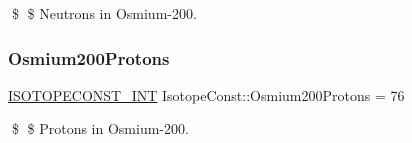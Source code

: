 \$ \$ Neutrons in Osmium-\/200. \mbox{\label{group___isotope_const-_osmium-_os200_ga6ffdf7ce7bc0f0890f05f348e34edfba}} 
\subsubsection{\texorpdfstring{Osmium200\+Protons}{Osmium200Protons}}
{\footnotesize\ttfamily \mbox{\hyperlink{group___isotope_const-_macros_ga5f18360b3e99483a35c32d789e62621c}{I\+S\+O\+T\+O\+P\+E\+C\+O\+N\+S\+T\+\_\+\+I\+NT}} Isotope\+Const\+::\+Osmium200\+Protons = 76}

\$ \$ Protons in Osmium-\/200. 